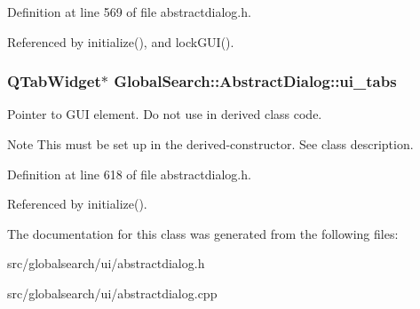 Definition at line 569 of file abstractdialog.\+h.



Referenced by initialize(), and lock\+G\+U\+I().

\hypertarget{classGlobalSearch_1_1AbstractDialog_acc93d22a99eb7c11610494ce754b1502}{}
\subsubsection[{ui\+\_\+tabs}]{\setlength{\rightskip}{0pt plus 5cm}Q\+Tab\+Widget$\ast$ Global\+Search\+::\+Abstract\+Dialog\+::ui\+\_\+tabs\hspace{0.3cm}{\ttfamily [protected]}}\label{classGlobalSearch_1_1AbstractDialog_acc93d22a99eb7c11610494ce754b1502}
Pointer to G\+U\+I element. Do not use in derived class code. \begin{DoxyNote}{Note}
This must be set up in the derived-\/constructor. See class description. 
\end{DoxyNote}


Definition at line 618 of file abstractdialog.\+h.



Referenced by initialize().



The documentation for this class was generated from the following files\+:\begin{DoxyCompactItemize}
\item 
src/globalsearch/ui/abstractdialog.\+h\item 
src/globalsearch/ui/abstractdialog.\+cpp\end{DoxyCompactItemize}
